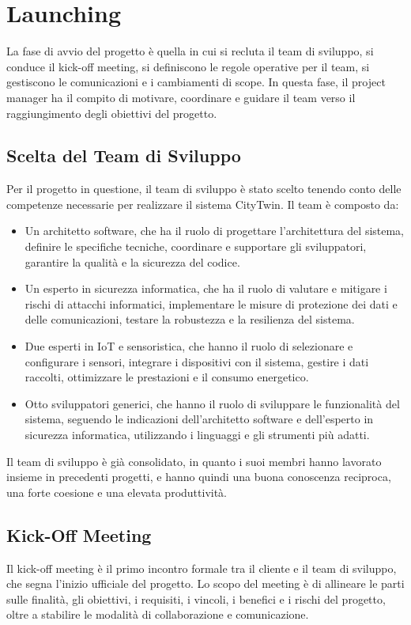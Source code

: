 \chapter{Launching}
La fase di avvio del progetto è quella in cui si recluta il team di sviluppo, si conduce il kick-off meeting, si definiscono le regole operative per il team, si gestiscono le comunicazioni e i cambiamenti di scope. In questa fase, il project manager ha il compito di motivare, coordinare e guidare il team verso il raggiungimento degli obiettivi del progetto.

\section{Scelta del Team di Sviluppo}
Per il progetto in questione, il team di sviluppo è stato scelto tenendo conto delle competenze necessarie per realizzare il sistema CityTwin. Il team è composto da:

\begin{itemize}
    \item Un architetto software, che ha il ruolo di progettare l'architettura del sistema, definire le specifiche tecniche, coordinare e supportare gli sviluppatori, garantire la qualità e la sicurezza del codice.
    \item Un esperto in sicurezza informatica, che ha il ruolo di valutare e mitigare i rischi di attacchi informatici, implementare le misure di protezione dei dati e delle comunicazioni, testare la robustezza e la resilienza del sistema.
    \item Due esperti in IoT e sensoristica, che hanno il ruolo di selezionare e configurare i sensori, integrare i dispositivi con il sistema, gestire i dati raccolti, ottimizzare le prestazioni e il consumo energetico.
    \item Otto sviluppatori generici, che hanno il ruolo di sviluppare le funzionalità del sistema, seguendo le indicazioni dell'architetto software e dell'esperto in sicurezza informatica, utilizzando i linguaggi e gli strumenti più adatti.
\end{itemize}

Il team di sviluppo è già consolidato, in quanto i suoi membri hanno lavorato insieme in precedenti progetti, e hanno quindi una buona conoscenza reciproca, una forte coesione e una elevata produttività.

\section{Kick-Off Meeting}
Il kick-off meeting è il primo incontro formale tra il cliente e il team di sviluppo, che segna l'inizio ufficiale del progetto. Lo scopo del meeting è di allineare le parti sulle finalità, gli obiettivi, i requisiti, i vincoli, i benefici e i rischi del progetto, oltre a stabilire le modalità di collaborazione e comunicazione.

